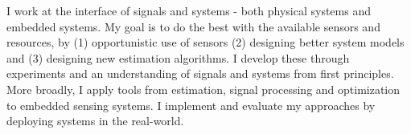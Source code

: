 \documentclass[10pt]{article}
\begin{document}
 


I work at the interface of signals and systems - both physical systems and embedded systems. 
My goal is to do the best with the available sensors and resources, by (1) opportunistic use of sensors (2) designing better system models and (3) designing new estimation algorithms. I develop these through experiments and an understanding of signals and systems from first principles. %
More broadly, I apply tools from estimation, signal processing and optimization to embedded sensing systems. I implement and evaluate my approaches by deploying systems in the real-world. \\
\end{document}
